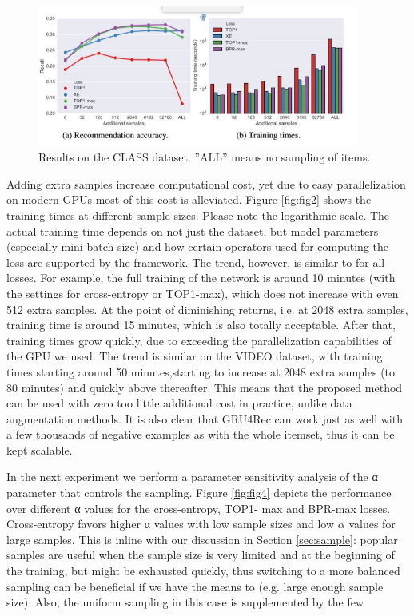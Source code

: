 \documentclass{article} %
\begin{document}
\begin{figure}[htp]
    \centering
    \includegraphics[width=400]{img/p3.JPG}
    \caption{Results on the CLASS dataset. ”ALL” means no sampling of items.}
    \label{fig:fig3}
\end{figure}

Adding extra samples increase computational cost, yet due to easy parallelization on modern GPUs most of this cost is alleviated. Figure \ref{fig:fig2} shows the training times at different sample sizes. Please note the logarithmic scale. The actual training time depends on not just the dataset, but model parameters (especially mini-batch size) and how certain operators used for computing the loss are supported by the framework. The trend, however, is similar to for all losses. For example, the full training of the network is around 10 minutes (with the settings for cross-entropy or TOP1-max), which does not increase with even 512 extra samples. At the point of diminishing returns, i.e. at 2048 extra samples, training time is around 15 minutes, which is also totally acceptable. After that, training times grow quickly, due to exceeding the parallelization capabilities of the GPU we used. The trend is similar on the VIDEO dataset, with training times starting around 50 minutes,starting to increase at 2048 extra samples (to 80 minutes) and quickly above thereafter. This means that the proposed method can be used with zero too little additional cost in practice, unlike data augmentation methods. It is also clear that GRU4Rec can work just as well with a few thousands of negative examples as with the whole itemset, thus it can be kept scalable.

In the next experiment we perform a parameter sensitivity analysis of the α parameter that controls the sampling. Figure \ref{fig:fig4} depicts the performance over different α values for the cross-entropy, TOP1- max and BPR-max losses. Cross-entropy favors higher α values with low sample sizes and low $\alpha$
values for large samples. This is inline with our discussion in Section \ref{sec:sample}: popular samples are useful
when the sample size is very limited and at the beginning of the training, but might be exhausted
quickly, thus switching to a more balanced sampling can be beneficial if we have the means to (e.g.
large enough sample size). Also, the uniform sampling in this case is supplemented by the few
\end{document}
